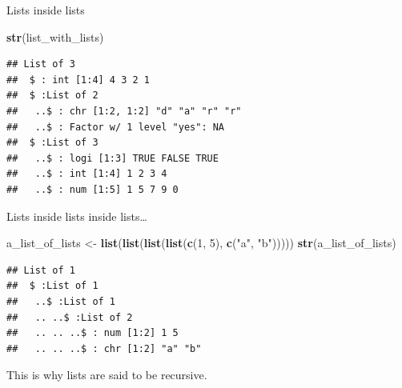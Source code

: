 \documentclass[ignorenonframetext,]{beamer}
\newenvironment{Shaded}{\begin{snugshade}}{\end{snugshade}}
\newcommand{\DecValTok}[1]{\textcolor[rgb]{0.00,0.00,0.81}{#1}}
\newcommand{\KeywordTok}[1]{\textcolor[rgb]{0.13,0.29,0.53}{\textbf{#1}}}
\newcommand{\NormalTok}[1]{#1}
\newcommand{\StringTok}[1]{\textcolor[rgb]{0.31,0.60,0.02}{#1}}
\begin{document}
\begin{frame}[fragile]{Lists inside lists}
\protect\hypertarget{lists-inside-lists-1}{}

\begin{Shaded}
\begin{Highlighting}[]
\KeywordTok{str}\NormalTok{(list_with_lists)}
\end{Highlighting}
\end{Shaded}

\begin{verbatim}
## List of 3
##  $ : int [1:4] 4 3 2 1
##  $ :List of 2
##   ..$ : chr [1:2, 1:2] "d" "a" "r" "r"
##   ..$ : Factor w/ 1 level "yes": NA
##  $ :List of 3
##   ..$ : logi [1:3] TRUE FALSE TRUE
##   ..$ : int [1:4] 1 2 3 4
##   ..$ : num [1:5] 1 5 7 9 0
\end{verbatim}

\end{frame}

\begin{frame}[fragile]{Lists inside lists inside lists\ldots{}}
\protect\hypertarget{lists-inside-lists-inside-lists}{}

\begin{Shaded}
\begin{Highlighting}[]
\NormalTok{a_list_of_lists <-}\StringTok{ }\KeywordTok{list}\NormalTok{(}\KeywordTok{list}\NormalTok{(}\KeywordTok{list}\NormalTok{(}\KeywordTok{list}\NormalTok{(}\KeywordTok{c}\NormalTok{(}\DecValTok{1}\NormalTok{, }\DecValTok{5}\NormalTok{),}
                                       \KeywordTok{c}\NormalTok{(}\StringTok{"a"}\NormalTok{, }\StringTok{"b"}\NormalTok{)))))}
\KeywordTok{str}\NormalTok{(a_list_of_lists)}
\end{Highlighting}
\end{Shaded}

\begin{verbatim}
## List of 1
##  $ :List of 1
##   ..$ :List of 1
##   .. ..$ :List of 2
##   .. .. ..$ : num [1:2] 1 5
##   .. .. ..$ : chr [1:2] "a" "b"
\end{verbatim}

This is why lists are said to be recursive.

\end{frame}
\end{document}
